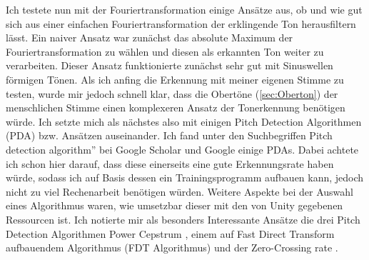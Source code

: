 Ich testete nun mit der Fouriertransformation einige Ansätze aus, ob und wie gut sich aus einer einfachen Fouriertransformation der erklingende Ton herausfiltern lässt. Ein naiver Ansatz war zunächst das absolute Maximum der Fouriertransformation zu wählen und diesen als erkannten Ton weiter zu verarbeiten. Dieser Ansatz funktionierte zunächst sehr gut mit Sinuswellen förmigen Tönen. Als ich anfing die Erkennung mit meiner eigenen Stimme zu testen, wurde mir jedoch schnell klar, dass die Obertöne (\ref{sec:Oberton}) der menschlichen Stimme einen komplexeren Ansatz der Tonerkennung benötigen würde. Ich setzte mich als nächstes also mit einigen Pitch Detection Algorithmen (PDA) bzw. Ansätzen auseinander. Ich fand unter den Suchbegriffen \glqq Pitch detection algorithm'' bei Google Scholar und Google einige PDAs. Dabei achtete ich schon hier darauf, dass diese einerseits eine gute Erkennungsrate haben würde, sodass ich auf Basis dessen ein Trainingsprogramm aufbauen kann, jedoch nicht zu viel Rechenarbeit benötigen würden. Weitere Aspekte bei der Auswahl eines Algorithmus waren, wie umsetzbar dieser mit den von Unity gegebenen Ressourcen ist. Ich notierte mir als besonders Interessante Ansätze die drei Pitch Detection Algorithmen Power Cepstrum \cite{norton2003fundamentals}, einem auf Fast Direct Transform aufbauendem Algorithmus (FDT Algorithmus) \cite{yazama2005simple} und der Zero-Crossing rate \cite{amado2008pitch}. 


